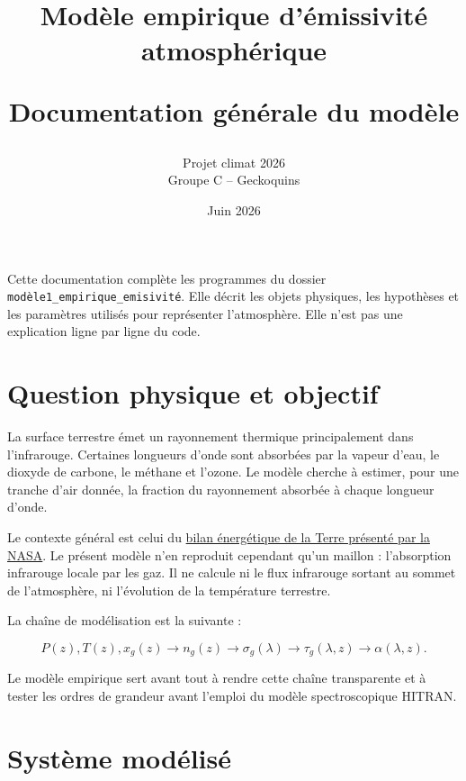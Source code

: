 \documentclass[11pt,a4paper]{article}
\title{\vspace{2.2cm}
  {\color{bleuCAPECL}\LARGE\bfseries Modèle empirique d'émissivité\\[0.25em]
  atmosphérique}\par\vspace{0.8cm}
  {\large Documentation générale du modèle}}
\author{Projet climat 2026\\Groupe C -- Geckoquins}
\date{Juin 2026}
\newcommand{\code}[1]{\texttt{#1}}
\begin{document}
\maketitle
\thispagestyle{empty}
\vfill
\begin{center}
\begin{minipage}{0.78\textwidth}
\small
Cette documentation complète les programmes du dossier
\code{modèle1\_empirique\_emisivité}. Elle décrit les objets physiques,
les hypothèses et les paramètres utilisés pour représenter l'atmosphère.
Elle n'est pas une explication ligne par ligne du code.
\end{minipage}
\end{center}
\vfill
\newpage

\tableofcontents
\newpage

\section{Question physique et objectif}

La surface terrestre émet un rayonnement thermique principalement dans
l'infrarouge. Certaines longueurs d'onde sont absorbées par la vapeur d'eau,
le dioxyde de carbone, le méthane et l'ozone. Le modèle cherche à estimer,
pour une tranche d'air donnée, la fraction du rayonnement absorbée à chaque
longueur d'onde.

Le contexte général est celui du
\href{https://science.nasa.gov/earth/earth-observatory/climate-and-earths-energy-budget/}{bilan
énergétique de la Terre présenté par la NASA}. Le présent modèle n'en
reproduit cependant qu'un maillon : l'absorption infrarouge locale par les
gaz. Il ne calcule ni le flux infrarouge sortant au sommet de l'atmosphère,
ni l'évolution de la température terrestre.

La chaîne de modélisation est la suivante :

\begin{equation*}
\boxed{P(z),T(z),x_g(z)}
\longrightarrow
\boxed{n_g(z)}
\longrightarrow
\boxed{\sigma_g(\lambda)}
\longrightarrow
\boxed{\tau_g(\lambda,z)}
\longrightarrow
\boxed{\alpha(\lambda,z)}.
\end{equation*}

Le modèle empirique sert avant tout à rendre cette chaîne transparente et à
tester les ordres de grandeur avant l'emploi du modèle spectroscopique
HITRAN.

\section{Système modélisé}
\end{document}
